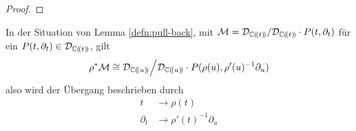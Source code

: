 \begin{proof}
\begin{comment}
GEGENBEISPIEL:\\
$Q:=\partial_u$, $u\in\cD_\Cful$\\
suche ein $y$ so dass $y\partial_u=u$\\
\begin{align*}
\_\!\cdot\!  Q(y) &= u \\
y\partial_u       &= u \\
y\partial_u u     &= u u & \mbox{\cite[Chap. 4.]{sabbah_cimpa90} links
multiplikation mit $u$ ist nicht bijektiv} \\
y                 &= u^2 \\
\end{align*}
aber
\begin{align*}
u^2\partial_u &= u\cdot u\cdot \partial_u \\
  &=u\cdot (\partial_u\cdot u -1) \\
  &=u\cdot (1 -1) \\
  &=0 \\
\end{align*}
\end{comment}
\end{proof}
%
\begin{lem} \label{lem:pull-back-hilfslemma3}
In der Situation von Lemma \ref{defn:pull-back}, mit
$\mathcal{M}=\mathcal{D}_{{\mathbb C (\!(t)\!)}}/\mathcal{D}_{{\mathbb C (\!(t)\!)}}\cdot P(t,\partial_t)$ für ein
$P(t,\partial_t)\in\mathcal{D}_{{\mathbb C (\!(t)\!)}}$, gilt
\[\rho^*\mathcal{M}\cong \mathcal{D}_{{\mathbb C (\!(u)\!)}}\Big/\mathcal{D}_{{\mathbb C (\!(u)\!)}}\cdot
  P(\rho(u),\rho'(u)^{-1}\partial_u) \]
also wird der Übergang beschrieben durch
\begin{align*}
t          &\rightarrow \rho(t) \\
\partial_t &\rightarrow \rho'(t)^{-1}\partial_u \\
\end{align*}
\end{lem}
